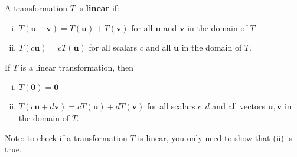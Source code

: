 \documentclass[10pt]{book}
\newenvironment{boxdef}{\begin{mdframed}[backgroundcolor=gray!30,linewidth=0pt,nobreak=true]}{\end{mdframed}}
\newcommand{\vect}[1]{\ensuremath{\boldsymbol{\mathbf{#1}}}}
\begin{document}
\begin{itemize}
		\begin{boxdef}
			A transformation $T$ is \textbf{linear} if:
			\begin{enumerate}[(i)]
				\item $T(\vect{u}+\vect{v}) = T(\vect{u})+T(\vect{v})$ for all $\vect{u}$ and $\vect{v}$ in the domain of $T$.
				\item $T(c\vect{u}) = cT(\vect{u})$ for all scalars $c$ and all $\vect{u}$ in the domain of $T$.
			\end{enumerate}
		\end{boxdef}
		\begin{boxdef}
			If $T$ is a linear transformation, then
			\begin{enumerate}[(i)]
				\item $T(\vect{0})=\vect{0}$
				\item $T(c\vect{u}+d\vect{v}) = cT(\vect{u})+dT(\vect{v})$ for all scalars $c,d$ and all vectors  $\vect{u},\vect{v}$ in the domain of $T$.
			\end{enumerate}
			Note: to check if a transformation $T$ is linear, you only need to show that (ii) is true.
		\end{boxdef}
\end{itemize}


\newpage


\end{document}
